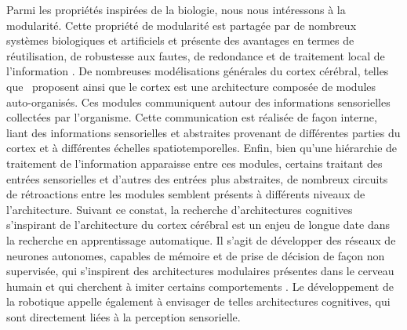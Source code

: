 Parmi les propriétés inspirées de la biologie, nous nous intéressons à la modularité.
Cette propriété de modularité est partagée par de nombreux systèmes biologiques et artificiels et présente des avantages en termes de réutilisation, de robustesse aux fautes, de redondance et de traitement local de l'information \parencite{clune_evolutionary_2013}. De nombreuses modélisations générales du cortex cérébral, telles que~\cite{binzegger05, Meunier2009HierarchicalMI,sporns_structure_2013,betzel_multi-scale_2017} proposent ainsi que le cortex est une architecture composée de modules auto-organisés. Ces modules communiquent autour des informations sensorielles collectées par l'organisme. Cette communication est réalisée de façon interne, liant des informations sensorielles et abstraites provenant de différentes parties du cortex et à différentes échelles spatiotemporelles. Enfin, bien qu'une hiérarchie de traitement de l'information apparaisse entre ces modules, certains traitant des entrées sensorielles et d'autres des entrées plus abstraites, de nombreux circuits de rétroactions entre les modules semblent présents à différents niveaux de l'architecture.
Suivant ce constat, la recherche d'architectures cognitives s'inspirant de l'architecture du cortex cérébral est un enjeu de longue date dans la recherche en apprentissage automatique. Il s'agit de développer des réseaux de neurones autonomes, capables de mémoire et de prise de décision de façon non supervisée, qui s'inspirent des architectures modulaires présentes dans le cerveau humain et qui cherchent à imiter certains comportements \parencite{Kotseruba201840YO}. Le développement de la robotique appelle également à envisager de telles architectures cognitives, qui sont directement liées à la perception sensorielle. 

